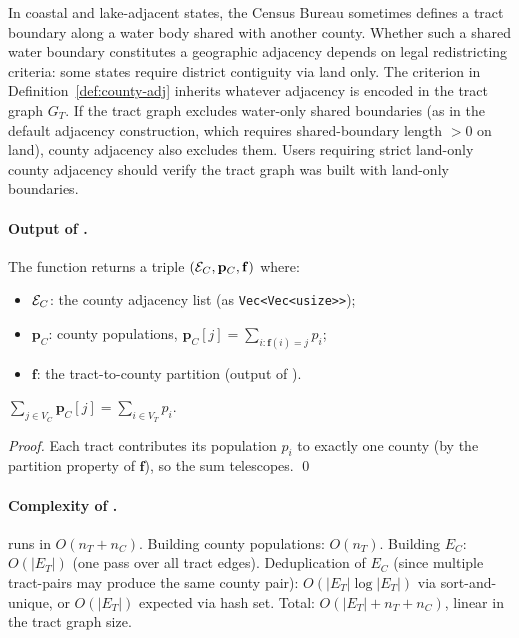 \begin{remark}
\label{rem:water}
In coastal and lake-adjacent states, the Census Bureau sometimes defines
a tract boundary along a water body shared with another county.
Whether such a shared water boundary constitutes a geographic adjacency
depends on legal redistricting criteria: some states require district
contiguity via land only.
The criterion in Definition~\ref{def:county-adj} inherits whatever
adjacency is encoded in the tract graph $G_T$.
If the tract graph excludes water-only shared boundaries (as in the
\redist{} default adjacency construction, which requires
shared-boundary length $> 0$ on land), county adjacency also excludes
them.
Users requiring strict land-only county adjacency should verify the
tract graph was built with land-only boundaries.
\end{remark}

\paragraph{Output of \buildc{}.}
The function returns a triple $(\mathcal{E}_C, \mathbf{p}_C, \mathbf{f})$ where:
\begin{itemize}
  \item $\mathcal{E}_C$: the county adjacency list (as \texttt{Vec<Vec<usize>>});
  \item $\mathbf{p}_C$: county populations, $\mathbf{p}_C[j] = \sum_{i: \mathbf{f}(i)=j} p_i$;
  \item $\mathbf{f}$: the tract-to-county partition (output of \derive{}).
\end{itemize}

\begin{proposition}
\label{prop:pop}
$\sum_{j \in V_C} \mathbf{p}_C[j] = \sum_{i \in V_T} p_i$.
\end{proposition}
\begin{proof}
Each tract contributes its population $p_i$ to exactly one county
(by the partition property of $\mathbf{f}$), so the sum telescopes. \qed
\end{proof}

\paragraph{Complexity of \buildc{}.}
\derive{} runs in $O(n_T + n_C)$.
Building county populations: $O(n_T)$.
Building $E_C$: $O(|E_T|)$ (one pass over all tract edges).
Deduplication of $E_C$ (since multiple tract-pairs may produce the same
county pair): $O(|E_T| \log |E_T|)$ via sort-and-unique, or $O(|E_T|)$
expected via hash set.
Total: $O(|E_T| + n_T + n_C)$, linear in the tract graph size.

